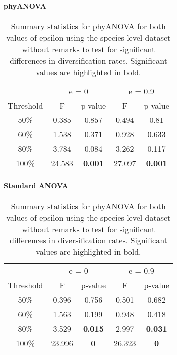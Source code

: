 \documentclass[]{article}
\let\oldparagraph\paragraph
\renewcommand{\paragraph}[1]{\oldparagraph{#1}\mbox{}}
\begin{document}
\hypertarget{phyanova}{%
\paragraph{phyANOVA}\label{phyanova}}

\begin{table}[H]

\caption{\label{tab:unnamed-chunk-4}Summary statistics for phyANOVA for both values of epsilon using the species-level dataset without remarks to test for significant differences in diversification rates. Significant values are highlighted in bold.}
\centering
\begin{tabular}{c|c|c|c|c}
\hline
\multicolumn{1}{c|}{ } & \multicolumn{2}{c|}{e = 0} & \multicolumn{2}{c}{e = 0.9} \\
\cline{2-3} \cline{4-5}
Threshold & F & p-value & F & p-value\\
\hline
50\% & 0.385 & 0.857 & 0.494 & 0.81\\
\hline
60\% & 1.538 & 0.371 & 0.928 & 0.633\\
\hline
80\% & 3.784 & 0.084 & 3.262 & 0.117\\
\hline
100\% & 24.583 & \textbf{0.001} & 27.097 & \textbf{0.001}\\
\hline
\end{tabular}
\end{table}

\hypertarget{standard-anova}{%
\paragraph{Standard ANOVA}\label{standard-anova}}

\begin{table}[H]

\caption{\label{tab:unnamed-chunk-5}Summary statistics for phyANOVA for both values of epsilon using the species-level dataset without remarks to test for significant differences in diversification rates. Significant values are highlighted in bold.}
\centering
\begin{tabular}{c|c|c|c|c}
\hline
\multicolumn{1}{c|}{ } & \multicolumn{2}{c|}{e = 0} & \multicolumn{2}{c}{e = 0.9} \\
\cline{2-3} \cline{4-5}
Threshold & F & p-value & F & p-value\\
\hline
50\% & 0.396 & 0.756 & 0.501 & 0.682\\
\hline
60\% & 1.563 & 0.199 & 0.948 & 0.418\\
\hline
80\% & 3.529 & \textbf{0.015} & 2.997 & \textbf{0.031}\\
\hline
100\% & 23.996 & \textbf{0} & 26.323 & \textbf{0}\\
\hline
\end{tabular}
\end{table}
\end{document}
